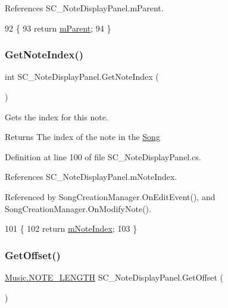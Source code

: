 References S\+C\+\_\+\+Note\+Display\+Panel.\+m\+Parent.


\begin{DoxyCode}
92     \{
93         \textcolor{keywordflow}{return} \hyperlink{group___s_c___n_d_p_priv_var_ga360017747d9ed8910ddd4b3309477710}{mParent};
94     \}
\end{DoxyCode}
\mbox{\label{group___s_c___n_d_p_unity_ga8beef050026ade4ba4ccb574c414d24e}} 
\subsubsection{\texorpdfstring{Get\+Note\+Index()}{GetNoteIndex()}}
{\footnotesize\ttfamily int S\+C\+\_\+\+Note\+Display\+Panel.\+Get\+Note\+Index (\begin{DoxyParamCaption}{ }\end{DoxyParamCaption})}



Gets the index for this note. 

\begin{DoxyReturn}{Returns}
The index of the note in the \hyperlink{class_song}{Song} 
\end{DoxyReturn}


Definition at line 100 of file S\+C\+\_\+\+Note\+Display\+Panel.\+cs.



References S\+C\+\_\+\+Note\+Display\+Panel.\+m\+Note\+Index.



Referenced by Song\+Creation\+Manager.\+On\+Edit\+Event(), and Song\+Creation\+Manager.\+On\+Modify\+Note().


\begin{DoxyCode}
101     \{
102         \textcolor{keywordflow}{return} \hyperlink{group___s_c___n_d_p_priv_var_ga11933919195aba904a4e8bf95f131e49}{mNoteIndex};
103     \}
\end{DoxyCode}
\mbox{\label{group___s_c___n_d_p_unity_ga371654221730812200062322c8a3e750}} 
\subsubsection{\texorpdfstring{Get\+Offset()}{GetOffset()}}
{\footnotesize\ttfamily \hyperlink{group___music_enums_gaf11b5f079adbb21c800b9eca1c5c3cbd}{Music.\+N\+O\+T\+E\+\_\+\+L\+E\+N\+G\+TH} S\+C\+\_\+\+Note\+Display\+Panel.\+Get\+Offset (\begin{DoxyParamCaption}{ }\end{DoxyParamCaption})}



